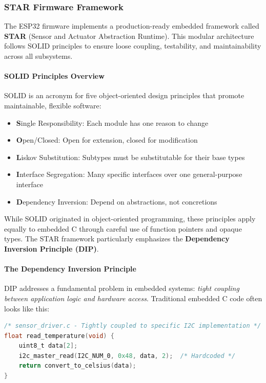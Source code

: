 \subsubsection{STAR Firmware Framework}

The ESP32 firmware implements a production-ready embedded framework called \textbf{STAR} (Sensor and Actuator Abstraction Runtime). This modular architecture follows SOLID principles to ensure loose coupling, testability, and maintainability across all subsystems.

\paragraph{SOLID Principles Overview}

SOLID is an acronym for five object-oriented design principles that promote maintainable, flexible software:

\begin{itemize}
    \item \textbf{S}ingle Responsibility: Each module has one reason to change
    \item \textbf{O}pen/Closed: Open for extension, closed for modification
    \item \textbf{L}iskov Substitution: Subtypes must be substitutable for their base types
    \item \textbf{I}nterface Segregation: Many specific interfaces over one general-purpose interface
    \item \textbf{D}ependency Inversion: Depend on abstractions, not concretions
\end{itemize}

While SOLID originated in object-oriented programming, these principles apply equally to embedded C through careful use of function pointers and opaque types. The STAR framework particularly emphasizes the \textbf{Dependency Inversion Principle (DIP)}.

\paragraph{The Dependency Inversion Principle}

DIP addresses a fundamental problem in embedded systems: \textit{tight coupling between application logic and hardware access}. Traditional embedded C code often looks like this:

\begin{lstlisting}[language=C, caption={Traditional Coupled Approach (Anti-Pattern)}, basicstyle=\tiny\ttfamily, frame=single, float=h]
/* sensor_driver.c - Tightly coupled to specific I2C implementation */
float read_temperature(void) {
    uint8_t data[2];
    i2c_master_read(I2C_NUM_0, 0x48, data, 2);  /* Hardcoded */
    return convert_to_celsius(data);
}
\end{lstlisting}

